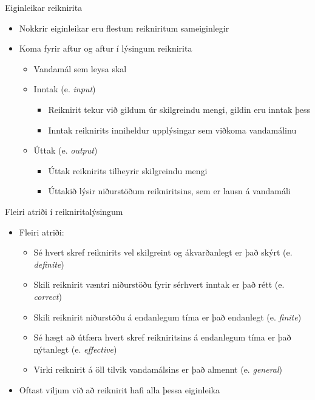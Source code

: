 \documentclass[handout]{beamer}
\begin{document}
\begin{frame}{Eiginleikar reiknirita}
    \begin{itemize}
     \item Nokkrir eiginleikar eru flestum reikniritum sameiginlegir
     \item Koma fyrir aftur og aftur í lýsingum reiknirita
     \begin{itemize}
      \item Vandamál sem leysa skal
      \item Inntak (e. \emph{input})
      \begin{itemize}
       \item Reiknirit tekur við gildum úr skilgreindu mengi, gildin eru inntak þess
       \item Inntak reiknirits inniheldur upplýsingar sem viðkoma vandamálinu
      \end{itemize}
      \item Úttak (e. \emph{output})
      \begin{itemize}
       \item Úttak reiknirits tilheyrir skilgreindu mengi
       \item Úttakið lýsir niðurstöðum reikniritsins, sem er lausn á vandamáli
      \end{itemize}
     \end{itemize}
    \end{itemize}
    \end{frame}
    
    \begin{frame}{Fleiri atriði í reikniritalýsingum}
    \begin{itemize}
     \item Fleiri atriði:
     \begin{itemize}
      \item Sé hvert skref reiknirits vel skilgreint og ákvarðanlegt er það skýrt (e. \emph{definite})
      \item Skili reiknirit væntri niðurstöðu fyrir sérhvert inntak er það rétt (e. \emph{correct})
      \item Skili reiknirit niðurstöðu á endanlegum tíma er það endanlegt (e. \emph{finite})
      \item Sé hægt að útfæra hvert skref reikniritsins á endanlegum tíma er það nýtanlegt (e. \emph{effective})
      \item Virki reiknirit á öll tilvik vandamálsins er það almennt (e. \emph{general})
     \end{itemize}
     \item Oftast viljum við að reiknirit hafi alla þessa eiginleika
    \end{itemize}
    \end{frame}
\end{document}
